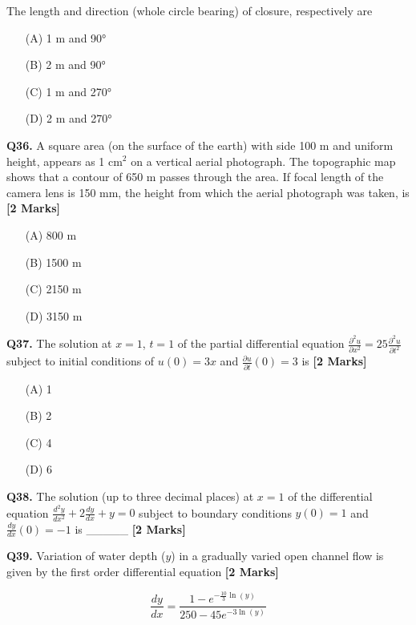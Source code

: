 \documentclass[11pt]{article}
\newcommand{\questionb}[2]{
    \noindent\textbf{Q#2.} #1 \hfill \textbf{[2 Marks]}
}
\begin{document}
The length and direction (whole circle bearing) of closure, respectively are
\begin{enumerate}
    \item[(A)] 1 m and 90°
    \item[(B)] 2 m and 90°
    \item[(C)] 1 m and 270°
    \item[(D)] 2 m and 270°
\end{enumerate}
\vspace{0.5cm}

\questionb{A square area (on the surface of the earth) with side 100 m and uniform height, appears as 1 cm\(^2\) on a vertical aerial photograph. The topographic map shows that a contour of 650 m passes through the area. If focal length of the camera lens is 150 mm, the height from which the aerial photograph was taken, is}{36}
\begin{enumerate}
    \item[(A)] 800 m
    \item[(B)] 1500 m
    \item[(C)] 2150 m
    \item[(D)] 3150 m
\end{enumerate}
\vspace{0.5cm}

\questionb{The solution at \( x = 1 \), \( t = 1 \) of the partial differential equation \(\frac{\partial^2 u}{\partial x^2} = 25 \frac{\partial^2 u}{\partial t^2}\) subject to initial conditions of \( u(0) = 3x \) and \(\frac{\partial u}{\partial t}(0) = 3 \) is}{37}
\begin{enumerate}
    \item[(A)] 1
    \item[(B)] 2
    \item[(C)] 4
    \item[(D)] 6
\end{enumerate}
\vspace{0.5cm}

\questionb{The solution (up to three decimal places) at \( x = 1 \) of the differential equation \(\frac{d^2 y}{dx^2} + 2 \frac{dy}{dx} + y = 0 \) subject to boundary conditions \( y(0) = 1 \) and \(\frac{dy}{dx}(0) = -1 \) is \_\_\_\_\_}{38}
\vspace{0.5cm}

\questionb{Variation of water depth (\( y \)) in a gradually varied open channel flow is given by the first order differential equation}{39}

\[ \frac{dy}{dx} = \frac{1 - e^{-\frac{10}{3} \ln(y)}}{250 - 45e^{-3 \ln(y)}} \]
\end{document}
